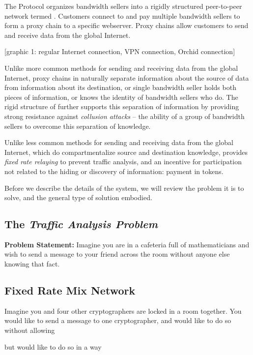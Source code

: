 The \Orchid{} Protocol organizes bandwidth sellers into a rigidly
structured peer-to-peer network termed \tOM{}. Customers connect to
\tOM{} and pay multiple bandwidth sellers to form a proxy chain to a
specific webserver. Proxy chains allow customers to send and receive
data from the global Internet.

[graphic 1: regular Internet connection, VPN connection, Orchid connection]

Unlike more common methods for sending and receiving data from the
global Internet, proxy chains in \tOM{} naturally separate information
about the source of data from information about its destination, or
single bandwidth seller holds both pieces of information, or knows the
identity of bandwidth sellers who do. The rigid structure of \tOM{}
further supports this separation of information by providing strong
resistance against \emph{collusion attacks} -- the ability of a group
of bandwidth sellers to overcome this separation of knowledge.

Unlike less common methods for sending and receiving data from the
global Internet, which do compartmentalize source and destination
knowledge, \tOM{} provides \emph{fixed rate relaying} to prevent
traffic analysis, and an incentive for participation not related to
the hiding or discovery of information: payment in tokens.

Before we describe the details of the system, we will review the
problem it is to solve, and the general type of solution embodied.


\subsection{The \emph{Traffic Analysis Problem}}

\textbf{Problem Statement:} Imagine you are in a cafeteria full of
mathematicians and wish to send a message to your friend across the
room without anyone else knowing that fact.



\subsection{Fixed Rate Mix Network}

Imagine you and four other cryptographers are locked in a room
together. You would like to send a message to one cryptographer, and
would like to do so without allowing

but would like to do so in a way

